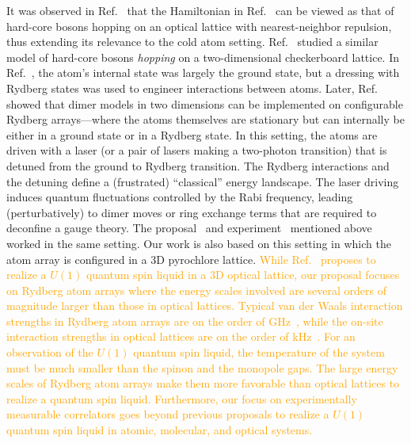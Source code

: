 \documentclass[twocolumn,superscriptaddress,amsmath,amssymb,aps,prx,nofootinbib]{revtex4-2}
\newcommand{\addtext}[1]{\textcolor{orange}{#1}}
\begin{document}
It was observed in Ref.~\cite{tewari2006emergence} that the Hamiltonian in Ref.~\cite{hermele2004} can be viewed as that of hard-core bosons hopping on an optical lattice with nearest-neighbor repulsion, thus extending its relevance to the cold atom setting. Ref.~\cite{glaetzle2014quantum} studied a similar model of hard-core bosons \textit{hopping} on a two-dimensional checkerboard lattice. In Ref.~\cite{glaetzle2014quantum}, the atom's internal state was largely the ground state, but a dressing with Rydberg states was used to engineer interactions between atoms. Later, Ref.~\cite{celi2020emerging} showed that dimer models in two dimensions can be implemented on configurable Rydberg arrays---where the atoms themselves are stationary but can internally be either in a ground state or in a Rydberg state. In this setting, the atoms are driven with a laser (or a pair of lasers making a two-photon transition) that is detuned from the ground to Rydberg transition. The Rydberg interactions and the detuning define a (frustrated) ``classical'' energy landscape. The laser driving induces quantum fluctuations controlled by the Rabi frequency, leading (perturbatively) to dimer moves or ring exchange terms that are required to deconfine a gauge theory. The proposal~\cite{verresen2021} and experiment~\cite{semeghini2021} mentioned above worked in the same setting. Our work is also based on this setting in which the atom array is configured in a 3D pyrochlore lattice.
\addtext{While Ref.~\cite{tewari2006emergence} proposes to realize a $U(1)$ quantum spin liquid in a 3D optical lattice, our proposal focuses on Rydberg atom arrays where the energy scales involved are several orders of magnitude larger than those in optical lattices. 
Typical van der Waals interaction strengths in Rydberg atom arrays are on the order of GHz~\cite{semeghini2021}, while the on-site interaction strengths in optical lattices are on the order of kHz~\cite{adler2024observation,wienand2024emergence,thomas2017meanfield}.
For an observation of the $U(1)$ quantum spin liquid, the temperature of the system must be much smaller than the spinon and the monopole gaps. 
The large energy scales of Rydberg atom arrays make them  more favorable than optical lattices to realize a quantum spin liquid.
Furthermore, our focus on experimentally measurable correlators goes beyond previous proposals to realize a $U(1)$ quantum spin liquid in atomic, molecular, and optical systems.}
\end{document}
